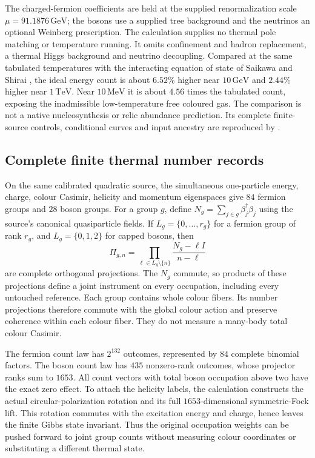 The charged-fermion coefficients are held at the supplied renormalization
scale $\mu=91.1876\,\mathrm{GeV}$; the bosons use a supplied tree background
and the neutrinos an optional Weinberg prescription. The calculation
supplies no thermal pole matching or temperature running. It omits
confinement and hadron replacement, a thermal Higgs
background and neutrino decoupling. Compared at the same tabulated
temperatures with the interacting equation of state of Saikawa and
Shirai \cite{pwsaikawa2018thermodynamics}, the ideal energy count is
about $6.52\%$ higher near $10\,\mathrm{GeV}$ and $2.44\%$ higher near
$1\,\mathrm{TeV}$. Near $10\,\mathrm{MeV}$ it is about $4.56$ times
the tabulated count, exposing the inadmissible low-temperature free
coloured gas. The comparison is not a native nucleosynthesis or relic
abundance prediction. Its complete finite-source controls, conditional
curves and input ancestry are reproduced by
 \cite{ophrepo}.

\subsection{Complete finite thermal number records}

On the same calibrated quadratic source, the simultaneous one-particle
energy, charge, colour Casimir, helicity and momentum eigenspaces give
$84$ fermion groups and $28$ boson groups. For a group $g$, define
$N_g=\sum_{j\in g}\beta_j^\dagger\beta_j$ using the source's canonical
quasiparticle fields. If $L_g=\{0,\ldots,r_g\}$ for a fermion group of
rank $r_g$, and $L_g=\{0,1,2\}$ for capped bosons, then
\[
 \Pi_{g,n}=\prod_{\ell\in L_g\setminus\{n\}}
              \frac{N_g-\ell I}{n-\ell}
\]
are complete orthogonal projections. The $N_g$ commute, so products of
these projections define a joint instrument on every occupation,
including every untouched reference. Each group contains whole colour
fibers. Its number projections therefore commute with the global colour
action and preserve coherence within each colour fiber. They do not
measure a many-body total colour Casimir.

The fermion count law has $2^{132}$ outcomes, represented by $84$ complete
binomial factors. The boson count law has $435$ nonzero-rank outcomes,
whose projector ranks sum to $1653$. All count vectors with total boson
occupation above two have the exact zero effect. To attach the helicity
labels, the calculation constructs the actual circular-polarization
rotation and its full $1653$-dimensional symmetric-Fock lift. This
rotation commutes with the excitation energy and charge, hence leaves
the finite Gibbs state invariant. Thus the original occupation weights
can be pushed forward to joint group counts without measuring colour
coordinates or substituting a different thermal state.

